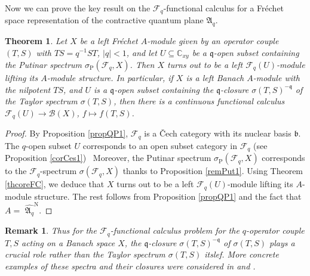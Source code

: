 \documentclass[12pt]{amsart}%
\newtheorem{theorem}{Theorem}
\theoremstyle{plain}
\newtheorem{remark}{Remark}
\numberwithin{equation}{section}
\numberwithin{equation}{section}
\numberwithin{theorem}{section}
\numberwithin{lemma}{section}
\numberwithin{remark}{section}
\numberwithin{example}{section}
\numberwithin{proposition}{section}
\numberwithin{definition}{section}
\numberwithin{corollary}{section}
\begin{document}
Now we can prove the key result on the $\mathcal{F}_{q}$-functional calculus
for a Fr\'{e}chet space representation of the contractive quantum plane
$\mathfrak{A}_{q}$.

\begin{theorem}
\label{thcoreFC2}Let $X$ be a left Fr\'{e}chet $A$-module given by an operator
couple $\left(  T,S\right)  $ with $TS=q^{-1}ST$, $\left\vert q\right\vert
<1$, and let $U\subseteq\mathbb{C}_{xy}$ be a $\mathfrak{q}$-open subset
containing the Putinar spectrum $\sigma_{\operatorname{P}}\left(
\mathcal{F}_{q},X\right)  $. Then $X$ turns out to be a left $\mathcal{F}%
_{q}\left(  U\right)  $-module lifting its $A$-module structure. In
particular, if $X$ is a left Banach $A$-module with the nilpotent $TS$, and
$U$ is a $\mathfrak{q}$-open subset containing the $\mathfrak{q}$-closure
$\sigma\left(  T,S\right)  ^{-\mathfrak{q}}$ of the Taylor spectrum
$\sigma\left(  T,S\right)  $, then there is a continuous functional calculus
$\mathcal{F}_{q}\left(  U\right)  \rightarrow\mathcal{B}\left(  X\right)  $,
$f\mapsto f\left(  T,S\right)  $.
\end{theorem}

\begin{proof}
By Proposition \ref{propQP1}, $\mathcal{F}_{q}$ is a \v{C}ech category with
its nuclear basis $\mathfrak{b}$. The $q$-open subset $U$ corresponds to an
open subset category in $\mathcal{F}_{q}$ (see Proposition \ref{corCes1})
\ Moreover, the Putinar spectrum $\sigma_{\operatorname{P}}\left(
\mathcal{F}_{q},X\right)  $ corresponds to the $\mathcal{F}_{q}$-spectrum
$\sigma\left(  \mathcal{F}_{q},X\right)  $ thanks to Proposition
\ref{remPut1}. Using Theorem \ref{thcoreFC}, we deduce that $X$ turns out to
be a left $\mathcal{F}_{q}\left(  U\right)  $-module lifting its $A$-module
structure. The rest follows from Proposition \ref{propQP1} and the fact that
$A=$ $\widehat{\mathfrak{A}_{q}}^{\text{N}}$.
\end{proof}

\begin{remark}
Thus for the $\mathcal{F}_{q}$-functional calculus problem for the
$q$-operator couple $T,S$ acting on a Banach space $X$, the $\mathfrak{q}%
$-closure $\sigma\left(  T,S\right)  ^{-\mathfrak{q}}$ of $\sigma\left(
T,S\right)  $ plays a crucial role rather than the Taylor spectrum
$\sigma\left(  T,S\right)  $ itslef. More concrete examples of these spectra
and their closures were considered in \cite{Dosi242} and \cite{DosiSS}.
\end{remark}
\end{document}
